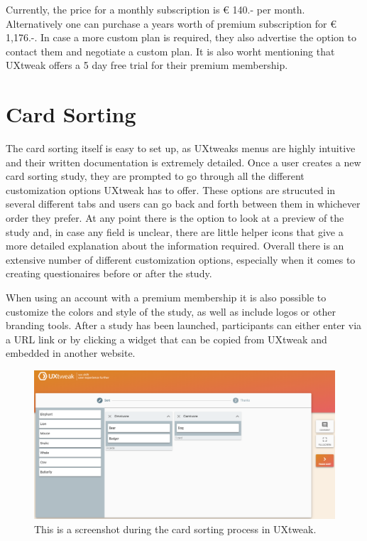 Currently, the price for a monthly subscription is € 140.- per month. 
Alternatively one can purchase a years worth of premium subscription for
€ 1,176.-. In case a more custom plan is required, they also advertise the 
option to contact them and negotiate a custom plan. It is also worht 
mentioning that UXtweak offers a 5 day free trial for their premium membership.

\section{Card Sorting}
The card sorting itself is  easy to set up, as UXtweaks menus are highly 
intuitive and their written documentation is extremely detailed. Once a user 
creates a new card sorting study, they are prompted to go through all the 
different customization options UXtweak has to offer. These options are 
strucuted in several different tabs and users can go back and forth between 
them in whichever order they prefer. At any point there is the option to look at
a preview of the study and, in case any field is unclear, there are little helper
icons that give a more detailed explanation about the information required. 
Overall there is an extensive number of different customization options,
especially when it comes to creating questionaires before or after the study. 

When using an account with a premium membership it is also possible to customize
the colors and style of the study, as well as include logos or other branding 
tools. After a study has been launched, participants can either enter via a URL 
link or by clicking a widget that can be copied from UXtweak and embedded in 
another website.

\begin{figure}[tp] 
\centering
\includegraphics[keepaspectratio,width=\linewidth,height=\halfh]{images/uxtweak-sorting.png}
\caption[UXtweak Card Sorting] { This is a screenshot during the card
sorting process in UXtweak.
 }
\label{fig:UXtweak2}
\end{figure}

